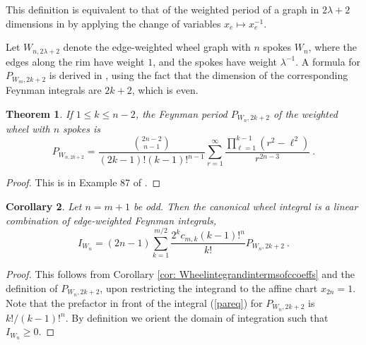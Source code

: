 \documentclass[10pt]{amsart}
\theoremstyle{plain}
\newtheorem{thm}{Theorem}
\newtheorem{cor}[thm]{Corollary}
\newcommand{\0}{\color{blue}{\mathsf{0}}}
\begin{document}
This definition is equivalent to that of the weighted period of a graph in $2\lambda+2$ dimensions in \cite{BorinskySchnetz} by applying the change of variables $x_e \mapsto x_e^{-1}.$

Let $W_{n,2\lambda+2}$ denote  the edge-weighted wheel graph with $n$ spokes $W_n$, where the edges along the rim have weight $1$, and the spokes have weight $\lambda^{-1}$. 
A formula for $P_{W_m,2k+2}$ is derived in \cite{BorinskySchnetz}, using the fact that the dimension of the corresponding Feynman integrals are $2k+2$, which is even. 
\begin{thm}\label{Wthm} If $1\leq k\leq n-2$, 
the Feynman period $P_{W_n,2k+2}$ of the weighted wheel with $n$ spokes is
\begin{equation}\label{PWeq}
P_{W_{n,2k+2}}=\frac{\genfrac(){0pt}{}{2n-2}{n-1}}{(2k-1)!(k-1)!^{n-1}}\sum_{r=1}^\infty\frac{\prod_{\ell=1}^{k-1}(r^2-\ell^2)}{r^{2n-3}} \ . 
\end{equation}
\end{thm}
\begin{proof}
This is in Example 87 of \cite{BorinskySchnetz}. 
\end{proof}
 
\begin{cor}\label{Wncor}
 Let $n=m+1$ be odd. Then the canonical wheel integral is a linear combination of edge-weighted Feynman integrals,
\begin{equation}\label{IWeq}
I_{W_n}=(2n-1)\sum_{k=1}^{m/2}\frac{2^kc_{m,k}(k-1)!^n}{k!}P_{W_n,2k +2}\ .
\end{equation}
\end{cor}
\begin{proof}
This follows from Corollary \ref{cor: Wheelintegrandintermsofccoeffs} and the definition of $P_{W_n,2k+2}$, upon restricting the integrand to the affine chart $x_{2n}=1$. Note that the prefactor in front of the integral (\ref{pareq}) for $P_{W_n,2k +2}$ is $k!/(k-1)!^n$. By definition we orient the domain of integration such that $I_{W_n}\geq0$.
\end{proof}
\end{document}
